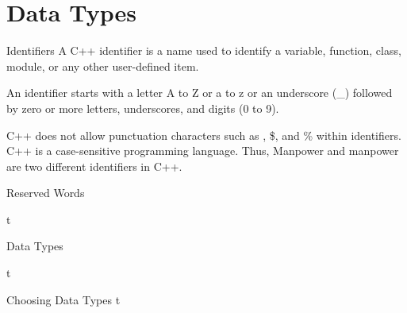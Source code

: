 \documentclass[../lecture2-variables.tex]{subfiles}
\begin{document}
\section{Data Types}


\begin{frame}[fragile]{Identifiers}
    A C++ identifier is a name used to identify a variable, function, class,
    module, or any other user-defined item. \newline \newline
    
    An identifier starts with a letter A to Z or a to z or an underscore (\_)
    followed by zero or more letters, underscores, and digits (0 to 9). \newline \newline
    
    C++ does not allow punctuation characters such as \@, \$, and \% within
    identifiers. C++ is a case-sensitive programming language. Thus, Manpower
    and manpower are two different identifiers in C++.
\end{frame}


\begin{frame}[fragile]{Reserved Words}

t

\end{frame}


\begin{frame}[fragile]{Data Types}

t

\end{frame}


\begin{frame}[fragile]{Choosing Data Types}
t
\end{frame}

\end{document}
